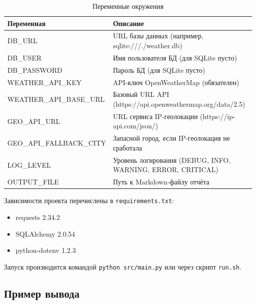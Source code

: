 \documentclass[11pt,a4paper]{article}
\begin{document}
\begin{table}[!ht]
\centering
\captionsetup{justification=raggedleft,singlelinecheck=false}
\caption*{Таблица 1}
\captionsetup{justification=centering,singlelinecheck=false}
\caption*{Переменные окружения}
%
\label{tab:env}
\renewcommand{\arraystretch}{1.12}
\begin{tabular}{|>{\ttfamily}p{}|>{\raggedright\arraybackslash}p{}|}
\hline
\textbf{Переменная} & \textbf{Описание}\\
\hline
DB\_URL & URL базы данных (например, sqlite:///./weather.db)\\
\hline
DB\_USER & Имя пользователя БД (для SQLite пусто)\\
\hline
DB\_PASSWORD & Пароль БД (для SQLite пусто)\\
\hline
WEATHER\_API\_KEY & API-ключ OpenWeatherMap (обязателен)\\
\hline
WEATHER\_API\_BASE\_URL & Базовый URL API (https://api.openweathermap.org/data/2.5)\\
\hline
GEO\_API\_URL & URL сервиса IP-геолокации (https://ip-api.com/json/)\\
\hline
GEO\_API\_FALLBACK\_CITY & Запасной город, если IP-геолокация не сработала\\
\hline
LOG\_LEVEL & Уровень логирования (DEBUG, INFO, WARNING, ERROR, CRITICAL)\\
\hline
OUTPUT\_FILE & Путь к Markdown-файлу отчёта\\
\hline
\end{tabular}
\end{table}

Зависимости проекта перечислены в \texttt{requirements.txt}:
\begin{itemize}
    \item requests 2.34.2
    \item SQLAlchemy 2.0.54
    \item python-dotenv 1.2.3
\end{itemize}

Запуск производится командой \texttt{python src/main.py} или через скрипт \texttt{run.sh}.

\newpage
\subsection*{Пример вывода}
\end{document}
